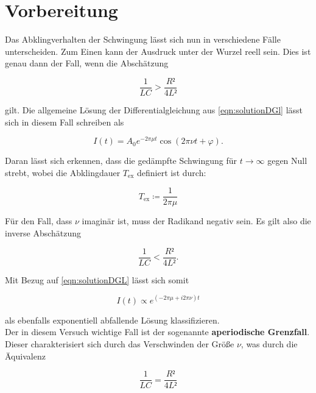 \section{Vorbereitung}

Das Abklingverhalten der Schwingung lässt sich nun in verschiedene Fälle unterscheiden. Zum Einen kann der Ausdruck 
unter der Wurzel reell sein. Dies ist genau dann der Fall, wenn die Abschätzung

\begin{equation}
\label{eqn:reell}
    \frac{1}{LC} > \frac{R²}{4L²}
\end{equation}

\noindent gilt. Die allgemeine Lösung der Differentialgleichung aus \eqref{eqn:solutionDGl} lässt sich in diesem Fall 
schreiben als

\begin{equation*}
    I(t) = A_0e^{-2\pi\mu{}t}\cos\left(2\pi\nu{}t + \varphi\right).
\end{equation*}

\noindent Daran lässt sich erkennen, dass die gedämpfte Schwingung für $t \rightarrow \infty$ gegen Null strebt, wobei
die Abklingdauer $T_\text{ex}$ definiert ist durch:

\begin{equation*}
    T_\text{ex} \coloneqq \frac{1}{2\pi\mu}
\end{equation*}

\noindent Für den Fall, dass $\nu$ imaginär ist, muss der Radikand negativ sein. Es gilt also die inverse Abschätzung 

\begin{equation}
\label{eqn:imaginaer}
    \frac{1}{LC} < \frac{R²}{4L²}.
\end{equation}

\noindent Mit Bezug auf \eqref{eqn:solutionDGL} lässt sich somit 

\begin{equation*}
    I(t) \propto e^{\left(-2\pi\mu + i2\pi\nu\right)t}
\end{equation*}

\noindent als ebenfalls exponentiell abfallende Lösung klassifizieren.\\
Der in diesem Versuch wichtige Fall ist der sogenannte \textbf{aperiodische Grenzfall}. Dieser charakterisiert sich durch 
das Verschwinden der Größe $\nu$, was durch die Äquivalenz 

\begin{equation}
\label{eqn:Grenzfall}
    \frac{1}{LC} = \frac{R²}{4L²}
\end{equation}

